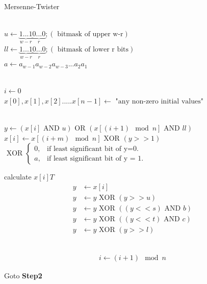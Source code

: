 \documentclass[12pt,journal,compsoc]{IEEEtran}
\begin{document}
\begin{algorithm}                      %
\caption{Mersenne-Twister}
\label{alg_mersenne_twister}                           %
\begin{algorithmic}                    %
    
    
     \\
    $u \leftarrow \underbrace{1...1}_{w-r}\underbrace{0...0}_{r}; (\text{ bitmask of upper w-r})$ \\ 
    $ll \leftarrow \underbrace{1...1}_{w-r}\underbrace{0...0}_{r}; (\text{ bitmask of lower r bits})$ \\
    $a \leftarrow a_{w-1}a_{w-2}a_{w-3}...a_{2}a_{1}$
    
    \\
    $i \leftarrow 0$ \\
    $x[0], x[1], x[2].....x[n-1]\leftarrow \text{ "any non-zero initial values"}$
    
    \\
    $y \leftarrow (x[i] \text{ AND }u) \text{ OR } (x[(i+1) \mod n] \text{ AND }ll)$ \\
    
    $x[i] \leftarrow x[(i+m) \mod n] \text{ XOR } (y>>1)$ \\
    	$
		\text{ XOR } \begin{cases}
					0, & \text{if least significant bit of y=0}.\\
    					a, & \text{if least significant bit of y = 1}.
				\end{cases}
    	$
    
     calculate $x[i]T$ \\ 
    \begin{align*}
    	y &\leftarrow x[i]\\
	y &\leftarrow y \text{ XOR } (y>>u) \\
	y &\leftarrow y \text{ XOR } ((y<<s) \text{ AND } b) \\
	y &\leftarrow y \text{ XOR } ((y << t) \text{ AND } c) \\
	y &\leftarrow y \text{ XOR } (y >> l)
\end{align*}
    
     \\
    \begin{align*}
    	i \leftarrow (i+1) \mod n
    \end{align*}
    
    Goto {\bf Step2}
\end{algorithmic}
\end{algorithm}
\end{document}
